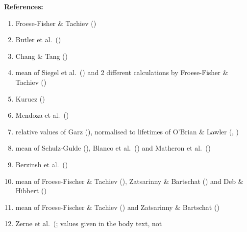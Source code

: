 \documentclass[traditabstract]{aa}
\begin{document}
\vspace{5mm}
\textbf{References:}\nopagebreak\\
\begin{minipage}[t]{0.43\linewidth}
\vspace{0pt}
\begin{enumerate}
\item Froese-Fisher \& Tachiev (\cite{FF})
\item Butler et al.\ (\cite{butl})
\item Chang \& Tang (\cite{Chang90})
\item mean of Siegel et al.\ (\cite{Siegel98}) and 2 different calculations by Froese-Fisher \& Tachiev (\cite{FF})
\item Kurucz (\cite{kur})
\item Mendoza et al.\ (\cite{mend})
\item relative values of Garz (\cite{garz}), normalised to lifetimes of O'Brian \& Lawler (\cite{obr1}, \cite{obr2})
\item mean of Schulz-Gulde (\cite{schu}), Blanco et al.\ (\cite{blan}) and Matheron et al.\ (\cite{math})
\item Berzinsh et al.\ (\cite{ber})
\item mean of Froese-Fischer \& Tachiev (\cite{FF}), Zatsarinny \& Bartschat (\cite{zats}) and Deb \& Hibbert (\cite{deb})
\item mean of Froese-Fischer \& Tachiev (\cite{FF}) and Zatsarinny \& Bartschat (\cite{zats})
\item Zerne et al.\ (\cite{zern}; values given in the body text, not
\end{enumerate}
\end{minipage}%
\begin{minipage}[t]{0.05\linewidth}
\vspace{0pt}
\hspace{3mm}
\end{minipage}%
\end{document}
